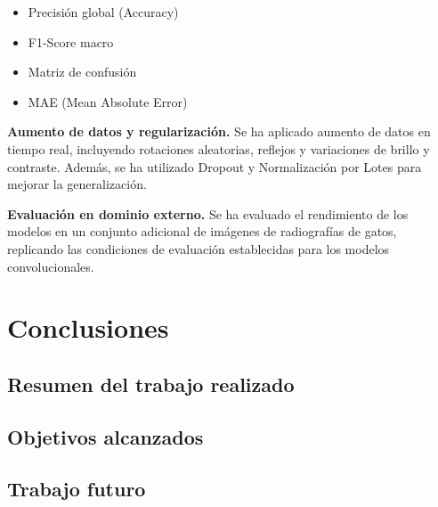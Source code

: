 \documentclass[11pt,spanish,listoffigures,listoftables]{tfgetsinf}
\begin{document}
\begin{itemize}
\item Precisión global (Accuracy)
\item F1-Score macro
\item Matriz de confusión
\item MAE (Mean Absolute Error)
\end{itemize}

\textbf{Aumento de datos y regularización.}
Se ha aplicado aumento de datos en tiempo real, incluyendo rotaciones aleatorias, reflejos y variaciones de brillo y contraste. Además, se ha utilizado Dropout y 
Normalización por Lotes para mejorar la generalización.

\textbf{Evaluación en dominio externo.}
Se ha evaluado el rendimiento de los modelos en un conjunto adicional de imágenes de radiografías de gatos, replicando las condiciones de evaluación establecidas 
para los modelos convolucionales.



\chapter{Conclusiones}  %

\section{Resumen del trabajo realizado} %

\section{Objetivos alcanzados}         %

\section{Trabajo futuro}               %

\end{document}
